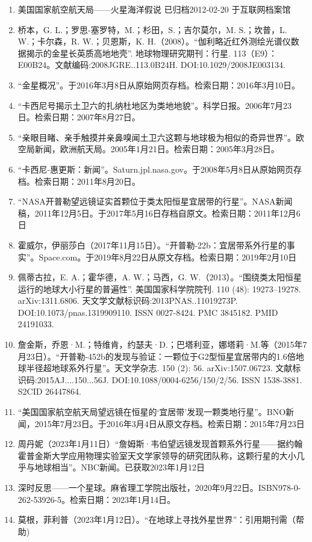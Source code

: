 \begin{enumerate}
\item 美国国家航空航天局——火星海洋假说 已归档2012-02-20 于互联网档案馆
\item 桥本，G. L.；罗思-塞罗特，M.；杉田，S.；吉尔莫尔，M. S.；坎普，L. W.；卡尔森，R. W.；贝恩斯，K. H.（2008）。“伽利略近红外测绘光谱仪数据揭示的金星长英质高地地壳”. 地球物理研究期刊：行星. 113（E9）：E00B24。文献编码:2008JGRE..113.0B24H. DOI:10.1029/2008JE003134.
\item “金星概况”。于2016年3月8日从原始网页存档。检索日期：2016年3月10日。
\item “卡西尼号揭示土卫六的扎纳杜地区为类地地貌”。科学日报。2006年7月23日。检索日期：2007年8月27日。
\item “亲眼目睹、亲手触摸并亲鼻嗅闻土卫六这颗与地球极为相似的奇异世界”。欧空局新闻，欧洲航天局。2005年1月21日。检索日期：2005年3月28日。
\item “卡西尼-惠更斯：新闻”。Saturn.jpl.nasa.gov。于2008年5月8日从原始网页存档。检索日期：2011年8月20日。
\item “NASA开普勒望远镜证实首颗位于类太阳恒星宜居带的行星”。NASA新闻稿，2011年12月5日。于2017年5月16日存档自原文。检索日期：2011年12月6日
\item 霍威尔，伊丽莎白（2017年11月15日）。“开普勒-22b：宜居带系外行星的事实”。Space.com。于2019年8月22日从原文存档。检索日期：2019年2月10日
\item 佩蒂古拉，E. A.；霍华德，A. W.；马西，G. W.（2013）。“围绕类太阳恒星运行的地球大小行星的普遍性”. 美国国家科学院院刊. 110 (48): 19273–19278. arXiv:1311.6806. 天文学文献标识码:2013PNAS..11019273P. DOI:10.1073/pnas.1319909110. ISSN 0027-8424. PMC 3845182. PMID 24191033.
\item 詹金斯，乔恩·M.；特维肯，约瑟夫·D.；巴塔利亚，娜塔莉·M.等（2015年7月23日）。“开普勒-452b的发现与验证：一颗位于G2型恒星宜居带内的1.6倍地球半径超地球系外行星”。天文学杂志. 150 (2): 56. arXiv:1507.06723. 文献标识码:2015AJ....150...56J. DOI:10.1088/0004-6256/150/2/56. ISSN 1538-3881. S2CID 26447864.
\item “美国国家航空航天局望远镜在恒星的‘宜居带’发现一颗类地行星”。BNO新闻，2015年7月23日。于2016年3月4日从原文存档。检索日期：2015年7月23日
\item 周丹妮（2023年1月11日）“詹姆斯·韦伯望远镜发现首颗系外行星——据约翰霍普金斯大学应用物理实验室天文学家领导的研究团队称，这颗行星的大小几乎与地球相当”。NBC新闻。已获取2023年1月12日
\item 深时反思——一个星球。麻省理工学院出版社，2020年9月22日。ISBN978-0-262-53926-5。检索日期：2023年1月14日。
\item 莫根，菲利普（2023年1月12日）。“在地球上寻找外星世界”：引用期刊需（帮助)

\end{enumerate}
